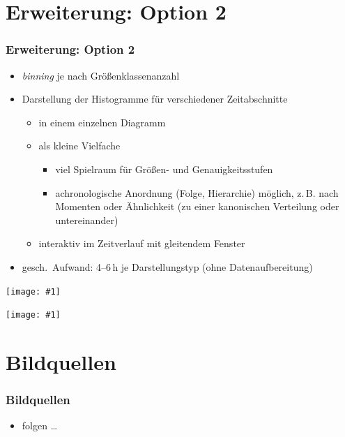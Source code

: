 \documentclass{beamer}
\newcommand{\wholeslidegraphics}[1]{
	\begin{center}
		\texttt{[image: \#1]}
	\end{center}
}
\begin{document}
    \section{Erweiterung: Option 2}
    \begin{frame}
			\frametitle{Erweiterung: Option 2}
			\begin{itemize}
				\setlength\itemsep{1em}
				\item \emph{binning} je nach Größenklassenanzahl
				\item Darstellung der Histogramme für verschiedener Zeitabschnitte
					\begin{itemize}
						\item in einem einzelnen Diagramm
						\item als kleine Vielfache
							\begin{itemize}
								\item viel Spielraum für Größen- und Genauigkeitsstufen
								\item achronologische Anordnung (Folge, Hierarchie) möglich, z.\,B. nach Momenten oder Ähnlichkeit (zu einer kanonischen Verteilung oder untereinander)
							\end{itemize}
						\item interaktiv im Zeitverlauf mit gleitendem Fenster
					\end{itemize}
				\item gesch.\ Aufwand: 4--6\,h je Darstellungstyp (ohne Datenaufbereitung)
			\end{itemize}
    \end{frame}
    \begin{frame}
    	\wholeslidegraphics{overlay-histogram}
    \end{frame}
    \begin{frame}
    	\wholeslidegraphics{histogram-small-multiples}
    \end{frame}

    \section{Bildquellen}
    \begin{frame}
    	\frametitle{Bildquellen}
    	\begin{itemize}
    		\item folgen \ldots
    	\end{itemize}
    \end{frame}
\end{document}
